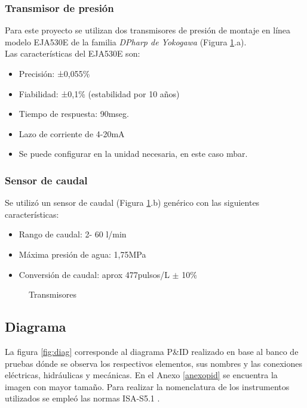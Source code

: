 \subsubsection{Transmisor de presión}
Para este proyecto se utilizan dos transmisores de presión de montaje en línea modelo EJA530E de la familia  \textit{DPharp de Yokogawa} (Figura \ref{fig:transd}.a).\\
Las características del EJA530E son:
\begin{itemize}
	\item Precisión: ±0,055\% 
	\item Fiabilidad: ±0,1\% (estabilidad por 10 años)
	\item Tiempo de respuesta: 90mseg.
	\item Lazo de corriente de 4-20mA
	\item Se puede configurar en la unidad necesaria, en este caso mbar.
\end{itemize}


\subsubsection{Sensor de caudal}
Se utilizó un sensor de caudal (Figura \ref{fig:transd}.b) genérico con las siguientes características:
\begin{itemize}
	\item Rango de caudal: 2- 60 l/min
	\item Máxima presión de agua: 1,75MPa
	\item Conversión de caudal: aprox 477pulsos/L $\pm$ 10\%
\end{itemize}


\begin{figure}[htbp]
	\centering
	\caption{Transmisores} \label{fig:transd}
\end{figure}





\subsection{Diagrama}
La figura \ref{fig:diag} corresponde al diagrama P\&ID realizado en base al banco de pruebas dónde se observa los respectivos elementos, sus nombres y las conexiones eléctricas, hidráulicas y mecánicas. En el Anexo \ref{anexopid} se encuentra la imagen con mayor tamaño.
 Para realizar la nomenclatura de los instrumentos utilizados se empleó las normas ISA-S5.1 \cite{ISA}. 

